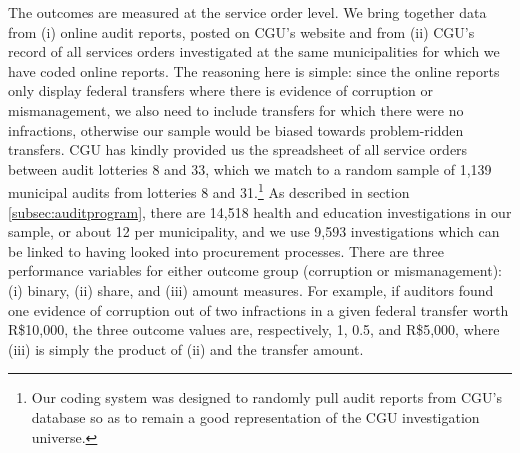 \documentclass[11pt]{article}
\begin{document}
The outcomes are measured at the service order level. We bring together data from (i) online audit reports, posted on CGU's website and from (ii) CGU's record of all services orders investigated at the same municipalities for which we have coded online reports. The reasoning here is simple: since the online reports only display federal transfers where there is evidence of corruption or mismanagement, we also need to include transfers for which there were no infractions, otherwise our sample would be biased towards problem-ridden transfers. CGU has kindly provided us the spreadsheet of all service orders between audit lotteries 8 and 33, which we match to a random sample of 1,139 municipal audits from lotteries 8 and 31.\footnote{Our coding system was designed to randomly pull audit reports from CGU's database so as to remain a good representation of the CGU investigation universe.} As described in section \ref{subsec:auditprogram}, there are 14,518 health and education investigations in our sample, or about 12 per municipality, and we use 9,593 investigations which can be linked to having looked into procurement processes. There are three performance variables for either outcome group (corruption or mismanagement): (i) binary, (ii) share, and (iii) amount measures. For example, if auditors found one evidence of corruption out of two infractions in a given federal transfer worth R\$10,000, the three outcome values are, respectively, 1, 0.5, and R\$5,000, where (iii) is simply the product of (ii) and the transfer amount.
\end{document}

